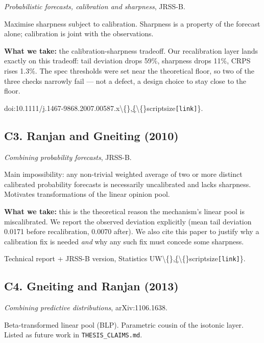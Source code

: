 \documentclass[11pt,a4paper,openany]{report}
\begin{document}
\emph{Probabilistic forecasts, calibration and sharpness}, JRSS-B.

Maximise sharpness subject to calibration. Sharpness is a property of the
forecast alone; calibration is joint with the observations.

\textbf{What we take:} the calibration-sharpness tradeoff. Our recalibration
layer lands exactly on this tradeoff: tail deviation drops 59\%,
sharpness drops 11\%, CRPS rises 1.3\%. The spec thresholds were set near
the theoretical floor, so two of the three checks narrowly fail — not a
defect, a design choice to stay close to the floor.

doi:10.1111/j.1467-9868.2007.00587.x\textbackslash\{\},\href{https://rss.onlinelibrary.wiley.com/doi/abs/10.1111/j.1467-9868.2007.00587.x}\{\textbackslash\{\}scriptsize\texttt{[link]}\}.

\subsection{C3. Ranjan and Gneiting (2010)}

\emph{Combining probability forecasts}, JRSS-B.

Main impossibility: any non-trivial weighted average of two or more
distinct calibrated probability forecasts is necessarily uncalibrated
and lacks sharpness. Motivates transformations of the linear opinion
pool.

\textbf{What we take:} this is the theoretical reason the mechanism's linear
pool is miscalibrated. We report the observed deviation explicitly
(mean tail deviation 0.0171 before recalibration, 0.0070 after). We
also cite this paper to justify why a calibration fix is needed
\emph{and} why any such fix must concede some sharpness.

Technical report + JRSS-B version, Statistics UW\textbackslash\{\},\href{http://stat.uw.edu/research/tech-reports/combining-probability-forecasts}\{\textbackslash\{\}scriptsize\texttt{[link]}\}.

\subsection{C4. Gneiting and Ranjan (2013)}

\emph{Combining predictive distributions}, arXiv:1106.1638.

Beta-transformed linear pool (BLP). Parametric cousin of the isotonic
layer. Listed as future work in \texttt{THESIS\_CLAIMS.md}.
\end{document}
